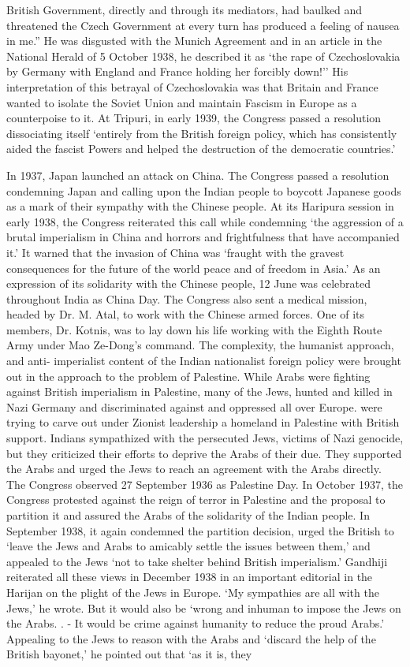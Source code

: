 \begin{multicols}{2}
British Government, directly and through its mediators, had baulked and threatened the Czech Government at every turn has produced a feeling of nausea in me.'' He was disgusted with the Munich Agreement and in an article in the National Herald of 5 October 1938, he described it as `the rape of Czechoslovakia by Germany with England and France holding her forcibly down!'' His interpretation of this betrayal of Czechoslovakia was that Britain and France wanted to isolate the Soviet Union and maintain Fascism in Europe as a counterpoise to it. At Tripuri, in early 1939, the Congress passed a resolution dissociating itself `entirely from the British foreign policy, which has consistently aided the fascist Powers and helped the destruction of the democratic countries.' 

In 1937, Japan launched an attack on China. The Congress passed a resolution condemning Japan and calling upon the Indian people to boycott Japanese goods as a mark of their sympathy with the Chinese people. At its Haripura session in early 1938, the Congress reiterated this call while condemning `the aggression of a brutal imperialism in China and horrors and frightfulness that have accompanied it.' It warned that the invasion of China was `fraught with the gravest consequences for the future of the world peace and of freedom in Asia.' As an expression of its solidarity with the Chinese people, 12 June was celebrated throughout India as China Day. The Congress also sent a medical mission, headed by Dr. M. Atal, to work with the Chinese armed forces. One of its members, Dr. Kotnis, was to lay down his life working with the Eighth Route Army under Mao Ze-Dong's command. The complexity, the humanist approach, and anti- imperialist content of the Indian nationalist foreign policy were brought out in the approach to the problem of Palestine. While Arabs were fighting against British imperialism in Palestine, many of the Jews, hunted and killed in Nazi Germany and discriminated against and oppressed all over Europe. were trying to carve out under Zionist leadership a homeland in Palestine with British support. Indians sympathized with the persecuted Jews, victims of Nazi genocide, but they criticized their efforts to deprive the Arabs of their due. They supported the Arabs and urged the Jews to reach an agreement with the Arabs directly. The Congress observed 27 September 1936 as Palestine Day. In October 1937, the Congress protested against the reign of terror in Palestine and the proposal to partition it and assured the Arabs of the solidarity of the Indian people. In September 1938, it again condemned the partition decision, urged the British to `leave the Jews and Arabs to amicably settle the issues between them,' and appealed to the Jews `not to take shelter behind British imperialism.' Gandhiji reiterated all these views in December 1938 in an important editorial in the Harijan on the plight of the Jews in Europe. `My sympathies are all with the Jews,' he wrote. But it would also be `wrong and inhuman to impose the Jews on the Arabs. . - It would be crime against humanity to reduce the proud Arabs.' Appealing to the Jews to reason with the Arabs and `discard the help of the British bayonet,' he pointed out that `as it is, they 
\end{multicols}
